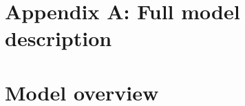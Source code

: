 \documentclass[11pt]{article}
\begin{document}


\newpage{}

\section*{Appendix A: Full model description}





\renewcommand{\theequation}{A\arabic{equation}}
\renewcommand{\thetable}{A\arabic{table}}
\setcounter{equation}{0}  %
\setcounter{figure}{0}
\setcounter{table}{0}

\section*{Model overview}
\end{document}
